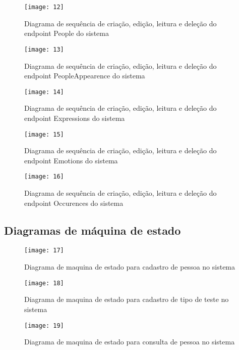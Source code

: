 \begin{figure}[h]
  \caption{Diagrama de sequência de criação, edição, leitura e deleção do endpoint People do sistema}
  \centering
  \texttt{[image: 12]}
\end{figure}
\FloatBarrier

\begin{figure}[h]
  \caption{Diagrama de sequência de criação, edição, leitura e deleção do endpoint PeopleAppearence do sistema}
  \centering
  \texttt{[image: 13]}
\end{figure}
\FloatBarrier

\begin{figure}[h]
  \caption{Diagrama de sequência de criação, edição, leitura e deleção do endpoint Expressions do sistema}
  \centering
  \texttt{[image: 14]}
\end{figure}
\FloatBarrier

\begin{figure}[h]
  \caption{Diagrama de sequência de criação, edição, leitura e deleção do endpoint Emotions do sistema}
  \centering
  \texttt{[image: 15]}
\end{figure}
\FloatBarrier

\begin{figure}[h]
  \caption{Diagrama de sequência de criação, edição, leitura e deleção do endpoint Occurences do sistema}
  \centering
  \texttt{[image: 16]}
\end{figure}
\FloatBarrier

\subsection{Diagramas de máquina de estado \cite{30}}

\begin{figure}[h]
  \caption{Diagrama de maquina de estado para cadastro de pessoa no sistema}
  \centering
  \texttt{[image: 17]}
\end{figure}
\FloatBarrier

\begin{figure}[h]
  \caption{Diagrama de maquina de estado para cadastro de tipo de teste no sistema}
  \centering
  \texttt{[image: 18]}
\end{figure}
\FloatBarrier

\begin{figure}[h]
  \caption{Diagrama de maquina de estado para consulta de pessoa no sistema}
  \centering
  \texttt{[image: 19]}
\end{figure}
\FloatBarrier

